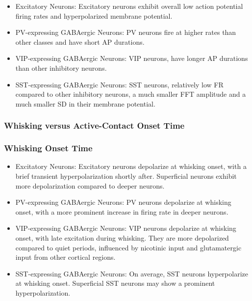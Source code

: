 \documentclass{IEEEtran}
\begin{document}
\begin{itemize}
  \item Excitatory Neurons: Excitatory neurons exhibit overall low action potential firing rates and hyperpolarized membrane potential.
  
  \item PV-expressing GABAergic Neurons: PV neurons fire at higher rates than other classes and have short AP durations.
  
  \item VIP-expressing GABAergic Neurons: VIP neurons, have longer AP durations than other inhibitory neurons.
  
  \item SST-expressing GABAergic Neurons: SST neurons, relatively low FR compared to other inhibitory neurons, a much smaller FFT amplitude and a much smaller SD in their membrane potential.
\end{itemize}


\subsubsection{Whisking versus Active-Contact Onset Time}

\subsubsection*{Whisking Onset Time}

\begin{itemize}
    \item Excitatory Neurons: Excitatory neurons depolarize at whisking onset, with a brief transient hyperpolarization shortly after. Superficial neurons exhibit more depolarization compared to deeper neurons.
    
    \item PV-expressing GABAergic Neurons: PV neurons depolarize at whisking onset, with a more prominent increase in firing rate in deeper neurons.
    
    \item VIP-expressing GABAergic Neurons: VIP neurons depolarize at whisking onset, with late excitation during whisking. They are more depolarized compared to quiet periods, influenced by nicotinic input and glutamatergic input from other cortical regions.
    
    \item SST-expressing GABAergic Neurons: On average, SST neurons hyperpolarize at whisking onset. Superficial SST neurons may show a prominent hyperpolarization.
\end{itemize}
\end{document}
